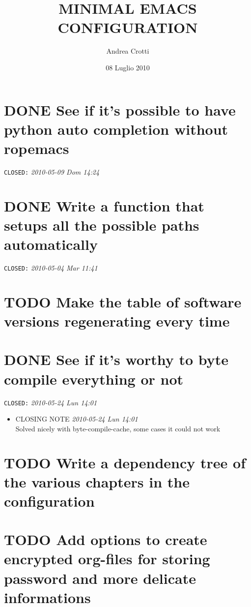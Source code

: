 \documentclass[11pt]{article}
\title{MINIMAL EMACS CONFIGURATION}
\author{Andrea Crotti}
\date{08 Luglio 2010}
\begin{document}
\maketitle

\setcounter{tocdepth}{3}
\tableofcontents
\vspace*{1cm}
\section{\textbf{DONE} See if it's possible to have python auto completion without ropemacs}
\label{sec-1}

  \texttt{CLOSED:} \textit{2010-05-09 Dom 14:24}\newline
\section{\textbf{DONE} Write a function that setups all the possible paths automatically}
\label{sec-2}

  \texttt{CLOSED:} \textit{2010-05-04 Mar 11:41}\newline
\section{\textbf{TODO} Make the table of software versions regenerating every time}
\label{sec-3}
\section{\textbf{DONE} See if it's worthy to byte compile everything or not}
\label{sec-4}

  \texttt{CLOSED:} \textit{2010-05-24 Lun 14:01}\newline
\begin{itemize}
\item CLOSING NOTE \textit{2010-05-24 Lun 14:01} \\
Solved nicely with byte-compile-cache, some cases it could not work
\end{itemize}
\section{\textbf{TODO} Write a dependency tree of the various chapters in the configuration}
\label{sec-5}
\section{\textbf{TODO} Add options to create encrypted org-files for storing password and more delicate informations}
\label{sec-6}
\end{document}
